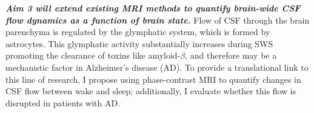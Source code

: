 \textbf{\textit{Aim 3 will extend existing MRI methods to quantify brain-wide CSF flow dynamics as a function of brain state.}} Flow of CSF through the brain parenchyma is regulated by the glymphatic system, which is formed by astrocytes. This glymphatic activity substantially increases during SWS promoting the clearance of toxins like amyloid-$\beta$, and therefore may be a mechanistic factor in Alzheimer's disease (AD).  To provide a translational link to this line of research, I propose using phase-contrast MRI to quantify changes in CSF flow between wake and sleep; additionally, I evaluate whether this flow is disrupted in patients with AD.  








